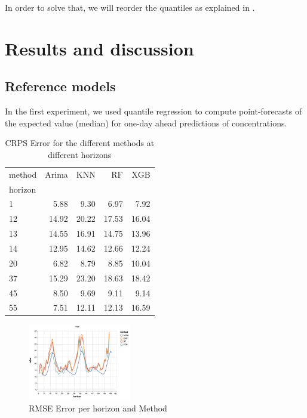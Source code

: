 \documentclass[a4paper,twocolumn,5p]{elsarticle}
\begin{document}
In order to solve that, we will reorder the quantiles as explained in \cite{xgb}. 

\section{Results and discussion}
\label{sec:results}

\subsection{Reference models}
\label{sec:deterministic}

In the first experiment, we used quantile regression to compute
point-forecasts of the expected value (median) for one-day ahead
predictions of \no concentrations.

\begin{table}[tbp]
\caption{\label{tab:determ}CRPS Error for the different methods at different
horizons 
}
  \centering
  \begin{tabular}{lrrrr}
    \toprule
    method &  Arima &   KNN &    RF &   XGB \\
    horizon &        &       &       &       \\
    \midrule
    1       &   5.88 &  9.30 &  6.97 &  7.92 \\
    12      &  14.92 & 20.22 & 17.53 & 16.04 \\
    13      &  14.55 & 16.91 & 14.75 & 13.96 \\
    14      &  12.95 & 14.62 & 12.66 & 12.24 \\
    20      &   6.82 &  8.79 &  8.85 & 10.04 \\
    37      &  15.29 & 23.20 & 18.63 & 18.42 \\
    45      &   8.50 &  9.69 &  9.11 &  9.14 \\
    55      &   7.51 & 12.11 & 12.13 & 16.59 \\
    \bottomrule
    \end{tabular}
\end{table}


\begin{figure}
  \caption{RMSE Error per horizon and Method}
  \centering
      \includegraphics[width=0.4\textwidth]{results/rmse}
\end{figure}
\end{document}
